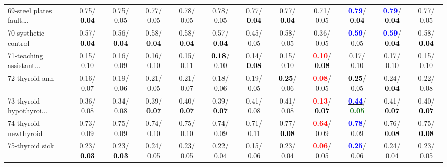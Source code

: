 \begin{table}[h]
\begin{center}
{\begin{tabular}{lc|c|c|c|c|c|c|c|c|c|c}
69-steel plates fault... &   0.75/\textcolor{black}{\textbf{  0.04}} &   0.75/  0.05 &   0.77/  0.05 &   0.78/  0.05 &   0.78/  0.05 &   0.77/\textcolor{black}{\textbf{  0.04}} &   0.77/\textcolor{black}{\textbf{  0.04}} &   0.71/  0.05 & \textcolor{blue}{\textbf{  0.79}}/\textcolor{black}{\textbf{  0.04}} & \textcolor{blue}{\textbf{  0.79}}/\textcolor{black}{\textbf{  0.04}} &   0.77/  0.05 \\
70-systhetic control &   0.57/\textcolor{black}{\textbf{  0.04}} &   0.56/\textcolor{black}{\textbf{  0.04}} &   0.58/\textcolor{black}{\textbf{  0.04}} &   0.58/\textcolor{black}{\textbf{  0.04}} &   0.57/\textcolor{black}{\textbf{  0.04}} &   0.45/  0.05 &   0.58/  0.05 &   0.36/  0.05 & \textcolor{blue}{\textbf{  0.59}}/  0.05 & \textcolor{blue}{\textbf{  0.59}}/\textcolor{black}{\textbf{  0.04}} &   0.58/\textcolor{black}{\textbf{  0.04}} \\
71-teaching assistant... &   0.15/  0.10 &   0.16/  0.09 &   0.16/  0.10 &   0.15/  0.11 & \textcolor{black}{\textbf{  0.18}}/  0.10 &   0.14/\textcolor{black}{\textbf{  0.08}} &   0.15/  0.10 & \textcolor{red}{\textbf{  0.10}}/\textcolor{black}{\textbf{  0.08}} &   0.17/  0.10 &   0.17/  0.10 &   0.15/  0.10 \\ \hline
72-thyroid ann &   0.16/  0.07 &   0.19/  0.06 &   0.21/  0.05 &   0.21/  0.07 &   0.18/  0.06 &   0.19/  0.05 & \textcolor{black}{\textbf{  0.25}}/  0.06 & \textcolor{red}{\textbf{  0.08}}/  0.05 & \textcolor{black}{\textbf{  0.25}}/  0.05 &   0.24/\textcolor{black}{\textbf{  0.04}} &   0.22/  0.08 \\
73-thyroid hypothyroi... &   0.36/  0.08 &   0.34/  0.08 &   0.39/\textcolor{black}{\textbf{  0.07}} &   0.40/\textcolor{black}{\textbf{  0.07}} &   0.39/\textcolor{black}{\textbf{  0.07}} &   0.41/  0.08 &   0.41/  0.08 & \textcolor{red}{\textbf{  0.13}}/\textcolor{black}{\textbf{  0.07}} & \underline{\textcolor{blue}{\textbf{  0.44}}}/\textcolor{darkgreen}{\textbf{  0.05}} &   0.41/\textcolor{black}{\textbf{  0.07}} &   0.40/\textcolor{black}{\textbf{  0.07}} \\
74-thyroid newthyroid &   0.73/  0.09 &   0.75/  0.09 &   0.74/  0.10 &   0.75/  0.10 &   0.74/  0.09 &   0.71/  0.11 &   0.77/\textcolor{black}{\textbf{  0.08}} & \textcolor{red}{\textbf{  0.64}}/  0.09 & \textcolor{blue}{\textbf{  0.78}}/  0.09 &   0.76/\textcolor{black}{\textbf{  0.08}} &   0.75/\textcolor{black}{\textbf{  0.08}} \\
75-thyroid sick &   0.23/\textcolor{black}{\textbf{  0.03}} &   0.23/\textcolor{black}{\textbf{  0.03}} &   0.24/  0.05 &   0.23/  0.05 &   0.22/  0.04 &   0.15/  0.06 &   0.23/  0.04 & \textcolor{red}{\textbf{  0.06}}/  0.05 & \textcolor{blue}{\textbf{  0.25}}/  0.06 &   0.24/  0.04 &   0.23/  0.05 \\

\end{tabular}}
\end{center}
\end{table}
